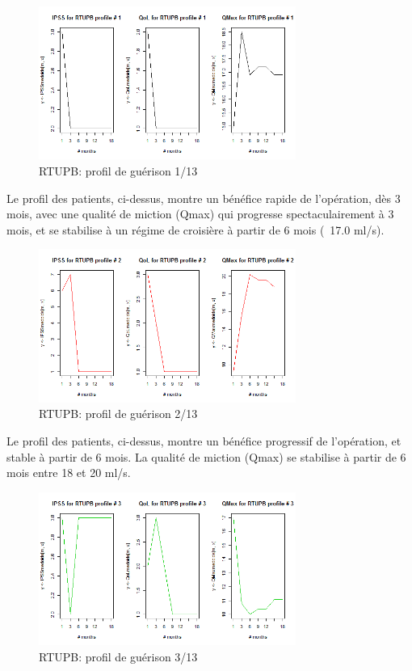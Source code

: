 %
%

%

\begin{figure}[H]
\centering
\includegraphics[width=0.75\textwidth]{../Fig/RTUPB/rtupb-profil-post-01.png}
\caption{RTUPB: profil de guérison 1/13}
\end{figure}

Le profil des patients, ci-dessus, montre un bénéfice rapide de l'opération, dès 3 mois, avec une qualité de miction (Qmax) qui progresse spectaculairement à 3 mois, et se stabilise à un régime de croisière à partir de 6 mois (~17.0 ml/s).

\begin{figure}[H]
\centering
\includegraphics[width=0.75\textwidth]{../Fig/RTUPB/rtupb-profil-post-02.png}
\caption{RTUPB: profil de guérison 2/13}
\end{figure}

Le profil des patients, ci-dessus, montre un bénéfice progressif de l'opération, et stable à partir de 6 mois. La qualité de miction (Qmax) se stabilise à partir de 6 mois entre 18 et 20 ml/s.

\begin{figure}[H]
\centering
\includegraphics[width=0.75\textwidth]{../Fig/RTUPB/rtupb-profil-post-03.png}
\caption{RTUPB: profil de guérison 3/13}
\end{figure}

